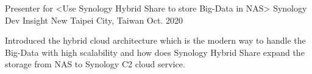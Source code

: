 

\begin{cventries}

  \cventry
    {Presenter for <Use Synology Hybrid Share to store Big-Data in NAS>} %
    {Synology Dev Insight} %
    {New Taipei City, Taiwan} %
    {Oct. 2020} %
    {
      \begin{cvitems} %
        \item {Introduced the hybrid cloud architecture which is the modern way to handle the Big-Data with high scalability and how does Synology Hybrid Share expand the storage from NAS to Synology C2 cloud service.}
      \end{cvitems}
    }
\end{cventries}
